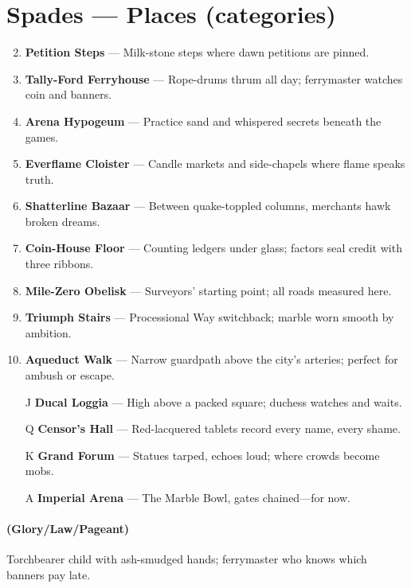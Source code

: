 \section*{Spades --- Places (categories)}
\label{sec:ecktoria-places}
\begin{enumerate}
\setcounter{enumi}{1}
\item \textbf{Petition Steps} --- Milk-stone steps where dawn petitions are pinned.
\item \textbf{Tally-Ford Ferryhouse} --- Rope-drums thrum all day; ferrymaster watches coin and banners.
\item \textbf{Arena Hypogeum} --- Practice sand and whispered secrets beneath the games.
\item \textbf{Everflame Cloister} --- Candle markets and side-chapels where flame speaks truth.
\item \textbf{Shatterline Bazaar} --- Between quake-toppled columns, merchants hawk broken dreams.
\item \textbf{Coin-House Floor} --- Counting ledgers under glass; factors seal credit with three ribbons.
\item \textbf{Mile-Zero Obelisk} --- Surveyors' starting point; all roads measured here.
\item \textbf{Triumph Stairs} --- Processional Way switchback; marble worn smooth by ambition.
\item \textbf{Aqueduct Walk} --- Narrow guardpath above the city's arteries; perfect for ambush or escape.
\item[J] \textbf{Ducal Loggia} --- High above a packed square; duchess watches and waits.
\item[Q] \textbf{Censor's Hall} --- Red-lacquered tablets record every name, every shame.
\item[K] \textbf{Grand Forum} --- Statues tarped, echoes loud; where crowds become mobs.
\item[A] \textbf{Imperial Arena} --- The Marble Bowl, gates chained---for now.
\end{enumerate}

\paragraph*{(Glory/Law/Pageant)} Torchbearer child with ash-smudged hands; ferrymaster who knows which banners pay late.

